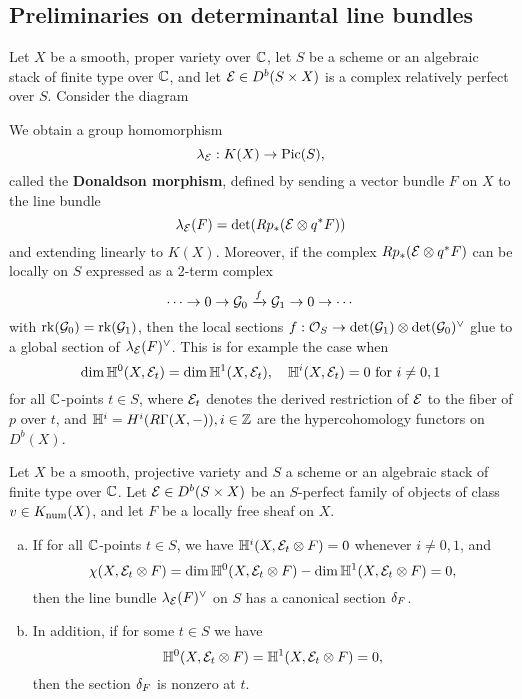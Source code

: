 \subsection{Preliminaries on determinantal line bundles}

Let $X$ be a smooth, proper variety over $\mathbb{C}$, let $S$ be a scheme or an algebraic stack of finite type over $\mathbb{C}$, and let $\mathcal{E} \in D^b(S \times X)$ is a complex relatively perfect over $S$. Consider the diagram
\begin{center}
\end{center}
We obtain a group homomorphism
\[ \lambda_{\mathcal{E}}: K(X) \to \mathrm{Pic}(S), \]
called the \textbf{Donaldson morphism}, defined by sending a vector bundle $F$ on $X$ to the line bundle
\[ \lambda_{\mathcal{E}}(F) = \det( R p_* (\mathcal{E} \otimes q^*F)) \]
and extending linearly to $K(X)$. Moreover, if the complex $R p_*(\mathcal{E} \otimes q^* F)$ can be locally on $S$ expressed as a 2-term complex
\[ \cdots \to 0 \to \mathcal{G}_0 \xrightarrow{f} \mathcal{G}_1 \to 0 \to \cdots \]
with $\operatorname{\mathrm{rk}}(\mathcal{G}_0) = \operatorname{\mathrm{rk}}(\mathcal{G}_1)$, then the local sections $f: \mathcal{O}_S \to \det(\mathcal{G}_1) \otimes \det(\mathcal{G}_0)^\vee$ glue to a global section of $\lambda_{\mathcal{E}}(F)^\vee$. This is for example the case when
\[ \dim \mathbb{H}^0(X, \mathcal{E}_t) = \dim \mathbb{H}^1(X, \mathcal{E}_t), \quad \mathbb{H}^i(X, \mathcal{E}_t) = 0 \text{ for } i \neq 0, 1 \]
for all $\mathbb{C}$-points $t \in S$, where $\mathcal{E}_t$ denotes the derived restriction of $\mathcal{E}$ to the fiber of $p$ over $t$, and $\mathbb{H}^i = H^i(R\Gamma(X, -)), i \in \mathbb{Z}$ are the hypercohomology functors on $D^b(X)$.
\begin{lem}\label{detsection}
    Let $X$ be a smooth, projective variety and $S$ a scheme or an algebraic stack of finite type over $\mathbb{C}$. Let $\mathcal{E} \in D^b(S \times X)$ be an $S$-perfect family of objects of class $v \in K_{\mathrm{num}}(X)$, and let $F$ be a locally free sheaf on $X$.
    \begin{enumerate}[(a)]
        \item If for all $\mathbb{C}$-points $t \in S$, we have $\mathbb{H}^i(X, \mathcal{E}_t \otimes F) = 0$ whenever $i \neq 0, 1$, and 
        \[ \chi(X, \mathcal{E}_t \otimes F) = \dim \mathbb{H}^0(X, \mathcal{E}_t \otimes F) - \dim \mathbb{H}^1(X, \mathcal{E}_t \otimes F) = 0, \]
        then the line bundle $\lambda_{\mathcal{E}}(F)^\vee$ on $S$ has a canonical section $\delta_F$.
        \item In addition, if for some $t \in S$ we have 
        \[ \mathbb{H}^0(X, \mathcal{E}_t \otimes F) = \mathbb{H}^1(X, \mathcal{E}_t \otimes F) = 0, \]
        then the section $\delta_F$ is nonzero at $t$.
    \end{enumerate}
\end{lem}

